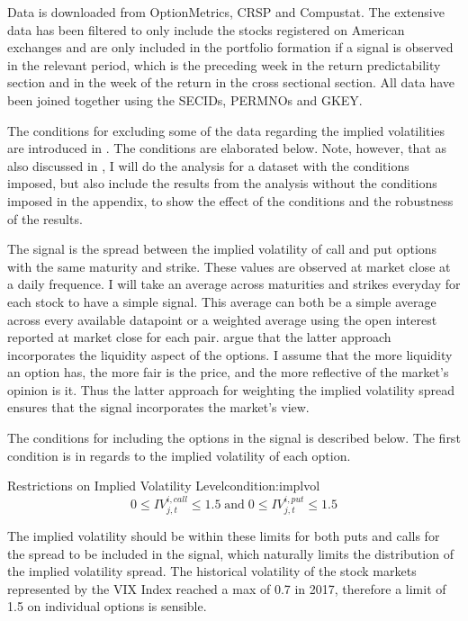 

Data is downloaded from OptionMetrics, CRSP and Compustat. The extensive data has been filtered to only include the stocks registered on American exchanges and are only included in the portfolio formation if a signal is observed in the relevant period, which is the preceding week in the return predictability section and in the week of the return in the cross sectional section. All data have been joined together using the SECIDs, PERMNOs and GKEY.

The conditions for excluding some of the data regarding the implied volatilities are introduced in \cite{cremers2010deviations}. The conditions are elaborated below. Note, however, that as also discussed in \cite{shang2016option}, I will do the analysis for a dataset with the conditions imposed, but also include the results from the analysis without the conditions imposed in the appendix, to show the effect of the conditions and the robustness of the results.
 
 

The signal is the spread between the implied volatility of call and put options with the same maturity and strike. These values are observed at market close at a daily frequence. I will take an average across maturities and strikes everyday for each stock to have a simple signal. This average can both be a simple average across every available datapoint or a weighted average using the open interest reported at market close for each pair. \cite{cremers2010deviations} argue that the latter approach incorporates the liquidity aspect of the options. I assume that the more liquidity an option has, the more fair is the price, and the more reflective of the market's opinion is it. Thus the latter approach for weighting the implied volatility spread ensures that the signal incorporates the market's view.

The conditions for including the options in the signal is described below. The first condition is in regards to the implied volatility of each option.

\begin{mycondition}{Restrictions on Implied Volatility Level}{condition:implvol}
	$$ 0 \leq IV_{j,t}^{i,call} \leq 1.5\; \text{and} \; 0 \leq IV_{j,t}^{i,put} \leq 1.5 $$
	
	The implied volatility should be within these limits for both puts and calls for the spread to be included in the signal, which naturally limits the distribution of the implied volatility spread.
	The historical volatility of the stock markets represented by the VIX Index reached a max of 0.7 in 2017, therefore a limit of 1.5 on individual options is sensible. 
\end{mycondition}


